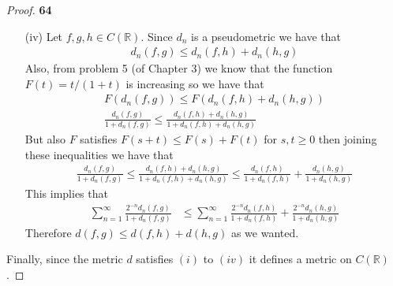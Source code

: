 \documentclass[11pt]{article}
\newcommand{\R}{\mathbb{R}}
\theoremstyle{definition}
\begin{document}
\begin{proof}{\textbf{64}}
\begin{itemize}
        \item [(iv)] Let $f,g,h \in C(\R)$.
        Since $d_n$ is a pseudometric we have that
        \begin{align*}
            d_n(f,g) \leq d_n(f,h) + d_n(h,g)
        \end{align*}
        Also, from problem 5 (of Chapter 3) we know that the function
        $F(t) = t/(1+t)$ is increasing so we have that
        \begin{align*}
            F(d_n(f,g)) \leq F(d_n(f,h) + d_n(h,g))\\
            \frac{d_n(f,g)}{1 + d_n(f,g)} \leq
            \frac{d_n(f,h) + d_n(h,g)}{1 +d_n(f,h) + d_n(h,g)}
        \end{align*}
        But also $F$ satisfies $F(s+t) \leq F(s) + F(t)$ for $s,t \geq 0$ then
        joining these inequalities we have that
        \begin{align*}
            \frac{d_n(f,g)}{1 + d_n(f,g)}
            \leq \frac{d_n(f,h) + d_n(h,g)}{1 + d_n(f,h) + d_n(h,g)}
            \leq \frac{d_n(f,h)}{1 + d_n(f,h)}
            + \frac{d_n(h,g)}{1 + d_n(h,g)} 
        \end{align*}
        This implies that
        \begin{align*}
            \sum_{n=1}^\infty\frac{2^{-n}d_n(f,g)}{1 + d_n(f,g)}
            &\leq\sum_{n=1}^\infty \frac{2^{-n}d_n(f,h)}{1 + d_n(f,h)}
            + \frac{2^{-n}d_n(h,g)}{1 + d_n(h,g)}
        \end{align*}
        Therefore $d(f,g) \leq d(f,h) + d(h,g)$ as we wanted.        
        \end{itemize}
        Finally, since the metric $d$ satisfies $(i)$ to $(iv)$ it defines a
        metric on $C(\R)$.
    \end{proof}
\end{document}

